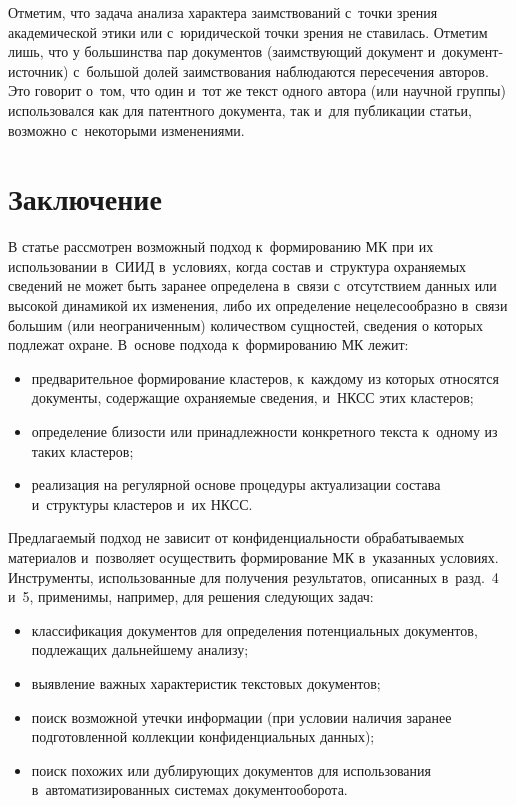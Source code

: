 \begin{multicols}{2}



  Отметим, что задача анализа характера заимствований с~точки зрения 
академической этики или с~юридической точки зрения не ставилась. Отметим 
лишь, что у большинства пар документов (заимствующий документ  
и~до\-ку\-мент-ис\-точ\-ник) с~большой долей заимствования наблюдаются 
пересечения авторов. Это говорит о~том, что один и~тот же текст одного 
автора (или научной группы) использовался как для патентного документа, 
так и~для публикации статьи, возможно с~некоторыми изменениями. 

\section{Заключение}
     
  В статье рассмотрен возможный подход к~формированию 
МК при их использовании в~СИИД в~условиях, когда состав 
и~структура охраняемых сведений не может быть заранее определена в~связи 
с~отсутствием данных или высокой динамикой их изменения, либо их 
определение нецелесообразно в~связи большим (или неограниченным) 
количеством сущностей, сведения о которых подлежат охране. В~основе 
подхода к~формированию МК лежит:
  \begin{itemize}
  \item  предварительное формирование кластеров, к~каждому из которых 
относятся документы, содержащие охраняемые сведения, и~НКСС этих 
кластеров;
  \item определение близости или принадлежности конкретного текста 
  к~одному из таких кластеров;
  \item  реализация на регулярной основе процедуры актуализации состава и~структуры кластеров и~их НКСС.
  \end{itemize}
  
  Предлагаемый подход не зависит от конфиденциальности обрабатываемых 
материалов и~позволяет осуществить формирование МК в~указанных 
условиях. Инструменты, использованные для получения результатов, 
описанных в~разд.~4 и~5, применимы, например, для решения следующих 
задач:
  \begin{itemize} 
  \item классификация документов для определения потенциальных 
документов, подлежащих дальнейшему анализу;
\item выявление важных характеристик текстовых документов;
\item поиск возможной утечки информации (при условии наличия 
заранее подготовленной коллекции конфиденциальных данных);
\item поиск похожих или дублирующих документов для использования 
в~автоматизированных сис\-те\-мах документооборота.
  \end{itemize}
  

\end{multicols}
